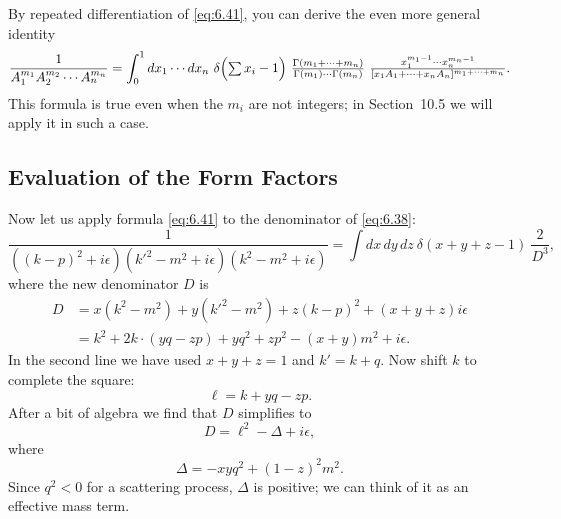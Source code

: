 By repeated differentiation of \eqref{eq:6.41}, you can derive the even more
general identity
\begin{equation}
  \frac{1}{A_1^{m_1}A_2^{m_2}\cdots A_n^{m_n}}
  = \int_0^1 dx_1\cdots dx_n\ \delta\Bigl( \textstyle\sum x_i - 1 \Bigr)\
    \frac{\Gamma(m_1+\cdots+m_n)}{\Gamma(m_1)\cdots\Gamma(m_n)}\
    \frac{x_1^{m_1-1}\cdots x_n^{m_n-1}}
      {[x_1A_1+\cdots+x_nA_n]^{m_1+\cdots+m_n}} .
  \label{eq:6.42}
\end{equation}
This formula is true even when the $m_i$ are not integers; in Section~10.5 we
will apply it in such a case.

\subsection{Evaluation of the Form Factors}

Now let us apply formula \eqref{eq:6.41} to the denominator of
\eqref{eq:6.38}:
\begin{equation}
  \frac{1}{((k-p)^2+i\epsilon)(k'^2-m^2+i\epsilon)(k^2-m^2+i\epsilon)}
  = \int dx\,dy\,dz\ \delta(x+y+z-1)\ \frac{2}{D^3} ,
\end{equation}
where the new denominator $D$ is
\begin{equation}
  \begin{aligned}
    D &= x(k^2-m^2) + y(k'^2-m^2) + z(k-p)^2 + (x+y+z)i\epsilon\\
    &= k^2 + 2k\cdot(yq-zp) + yq^2 + zp^2 - (x+y)m^2 + i\epsilon .
  \end{aligned}
\end{equation}
In the second line we have used $x+y+z=1$ and $k' = k+q$.  Now shift $k$ to
complete the square:
\begin{equation}
  \ell = k + yq - zp .
\end{equation}
After a bit of algebra we find that $D$ simplifies to
\begin{equation}
  D = \ell^2 - \Delta + i\epsilon,
  \label{eq:6.43}
\end{equation}
where
\begin{equation}
  \Delta = -xyq^2 + (1-z)^2m^2 .
  \label{eq:6.44}
\end{equation}
Since $q^2 < 0$ for a scattering process, $\Delta$ is positive; we can think
of it as an effective mass term.

